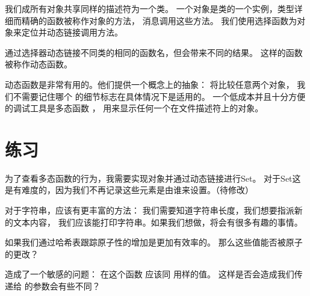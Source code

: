 我们成所有对象共享同样的描述符为一个类。
一个对象是类的一个实例，类型详细而精确的函数被称作对象的方法，
消息调用这些方法。
我们使用选择函数为对象来定位并动态链接调用方法。

通过选择器动态链接不同类的相同的函数名，但会带来不同的结果。
这样的函数被称作动态函数。

动态函数是非常有用的。他们提供一个概念上的抽象：
 将比较任意两个对象，
我们不需要记住哪个  的细节标志在具体情况下是适用的。
一个低成本并且十分方便的调试工具是多态函数 ，
用来显示任何一个在文件描述符上的对象。


\section{练习}
\label{sec:dlExer}

为了查看多态函数的行为，我需要实现对象并通过动态链接进行Set。
对于Set这是有难度的，因为我们不再记录这些元素是由谁来设置。（待修改）

对于字符串，应该有更丰富的方法：
我们需要知道字符串长度，我们想要指派新的文本内容，
我们应该能打印字符串。如果我们想做，将会有很多有趣的事情。

如果我们通过哈希表跟踪原子性的增加是更加有效率的。
那么这些值能否被原子的更改？

 造成了一个敏感的问题：
在这个函数  应该同  用样的值。
这样是否会造成我们传递给  的参数会有些不同？


\newpage{\thispagestyle{empty}\cleardoublepage}

